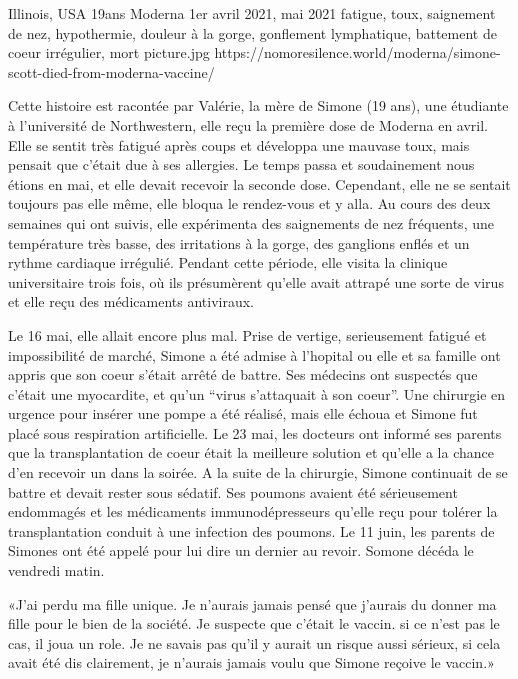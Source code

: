           {Illinois, USA}
          {19ans}
          {Moderna}
          {1er avril 2021, mai 2021}
          {fatigue, toux, saignement de nez, hypothermie, douleur à la gorge, gonflement lymphatique, battement de coeur irrégulier, mort}
          {picture.jpg}
          {https://nomoresilence.world/moderna/simone-scott-died-from-moderna-vaccine/}
          {

Cette histoire est racontée par Valérie, la mère de Simone (19 ans), une
étudiante à l'université de Northwestern, elle reçu la première dose de Moderna
en avril. Elle se sentit très fatigué après coups et développa une mauvase toux,
mais pensait que c'était due à ses allergies. Le temps passa et soudainement
nous étions en mai, et elle devait recevoir la seconde dose. Cependant, elle ne
se sentait toujours pas elle même, elle bloqua le rendez-vous et y alla. Au
cours des deux semaines qui ont suivis, elle expérimenta des saignements de nez
fréquents, une température très basse, des irritations à la gorge, des ganglions
enflés et un rythme cardiaque irrégulié. Pendant cette période, elle visita la
clinique universitaire trois fois, où ils présumèrent qu'elle avait attrapé une
sorte de virus et elle reçu des médicaments antiviraux.

Le 16 mai, elle allait encore plus mal. Prise de vertige, serieusement fatigué
et impossibilité de marché, Simone a été admise à l'hopital ou elle et sa
famille ont appris que son coeur s'était arrêté de battre. Ses médecins ont
suspectés que c'était une myocardite, et qu'un “virus s'attaquait à son
coeur”. Une chirurgie en urgence pour insérer une pompe a été réalisé, mais elle
échoua et Simone fut placé sous respiration artificielle. Le 23 mai, les
docteurs ont informé ses parents que la transplantation de coeur était la
meilleure solution et qu'elle a la chance d'en recevoir un dans la soirée. A la
suite de la chirurgie, Simone continuait de se battre et devait rester sous
sédatif. Ses poumons avaient été sérieusement endommagés et les médicaments
immunodépresseurs qu'elle reçu pour tolérer la transplantation conduit à une
infection des poumons. Le 11 juin, les parents de Simones ont été appelé pour
lui dire un dernier au revoir. Somone décéda le vendredi matin.

«J'ai perdu ma fille unique. Je n'aurais jamais pensé que j'aurais du donner ma
fille pour le bien de la société. Je suspecte que c'était le vaccin. si ce n'est
pas le cas, il joua un role. Je ne savais pas qu'il y aurait un risque aussi
sérieux, si cela avait été dis clairement, je n'aurais jamais voulu que Simone
reçoive le vaccin.»

}

